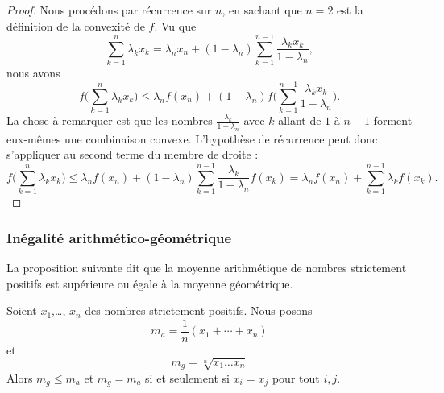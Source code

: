 \begin{proof}
    Nous procédons par récurrence sur \( n\), en sachant que \( n=2\) est la définition de la convexité de \( f\). Vu que
    \begin{equation}
        \sum_{k=1}^n\lambda_kx_k=\lambda_nx_n+(1-\lambda_n)\sum_{k=1}^{n-1}\frac{ \lambda_kx_k }{ 1-\lambda_n },
    \end{equation}
    nous avons
    \begin{equation}
        f\big( \sum_{k=1}^n\lambda_kx_k \big)\leq \lambda_nf(x_n)+(1-\lambda_n)f\big( \sum_{k=1}^{n-1}\frac{ \lambda_kx_k }{ 1-\lambda_n } \big).
    \end{equation}
    La chose à remarquer est que les nombres \( \frac{ \lambda_k }{ 1-\lambda_n }\) avec \( k\) allant de \( 1\) à \( n-1\) forment eux-mêmes une combinaison convexe. L'hypothèse de récurrence peut donc s'appliquer au second terme du membre de droite :
    \begin{equation}
        f\big( \sum_{k=1}^n\lambda_kx_k \big)\leq \lambda_nf(x_n)+(1-\lambda_n)\sum_{k=1}^{n-1}\frac{ \lambda_k }{ 1-\lambda_n }f(x_k)=\lambda_nf(x_n)+\sum_{k=1}^{n-1}\lambda_kf(x_k).
    \end{equation}
\end{proof}

\subsubsection{Inégalité arithmético-géométrique}

La proposition suivante dit que la moyenne arithmétique de nombres strictement positifs est supérieure ou égale à la moyenne géométrique.
\begin{proposition}    \label{PropWDPooBtHIAR}
    Soient \( x_1\),\ldots, \( x_n\) des nombres strictement positifs. Nous posons
    \begin{equation}
        m_a=\frac{1}{ n }(x_1+\cdots +x_n)
    \end{equation}
    et
    \begin{equation}
        m_g=\sqrt[n]{x_1\ldots x_n}
    \end{equation}
    Alors \( m_g\leq m_a\) et \( m_g=m_a\) si et seulement si \( x_i=x_j\) pour tout \( i,j\).
\end{proposition}

